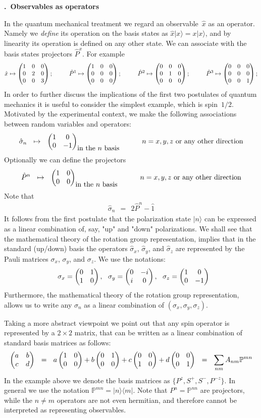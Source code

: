 \documentclass[onecolumn,fleqn, 11pt]{revtex4}
\newcommand{\amatrix}[1]{\begin{matrix} #1 \end{matrix}}
\newcommand{\beq}{\begin{eqnarray}}
\newcommand{\eeq}{\end{eqnarray}}
\renewcommand{\thesubsection}{\arabic{subsection}}
\renewcommand{\thesubsubsection}{\arabic{subsubsection}}
\newcommand{\sheadC}[1]
{
\addtocounter{subsubsection}{1}
\vspace{5mm}
{\bf \thesubsection.\thesubsubsection \ #1}  
\nopagebreak
\phantomsection
}
\begin{document}
 
\sheadC{Observables as operators}

In the quantum mechanical treatment 
we regard an observable~$\hat{x}$ as an operator.
Namely we {\em define} its operation on 
the basis states as $\hat{x}|x\rangle=x|x\rangle$, 
and by linearity its operation is defined on any other state.
We can associate with the basis states projectors $\hat{P}^x$.
For example  
\beq
\hat{x} \mapsto \left( \amatrix{1&0&0 \cr 0&2&0 \cr 0&0&3}\right);  
\ \ \ \ \ \ \ \
\hat{P}^1 \mapsto \left( \amatrix{1&0&0 \cr 0&0&0 \cr 0&0&0}\right);
\ \ \ \ \ \ \ \
\hat{P}^2 \mapsto \left( \amatrix{0&0&0 \cr 0&1&0 \cr 0&0&0}\right);
\ \ \ \ \ \ \ \
\hat{P}^3 \mapsto \left( \amatrix{0&0&0 \cr 0&0&0 \cr 0&0&1}\right);
\eeq
In order to further discuss the implications of the first two postulates 
of quantum mechanics it is useful to consider the simplest example, which is spin~$1/2$.
Motivated by the experimental context, we make the following associations between random variables and operators:
\beq
\hat{\sigma}_n \ \ \mapsto \ \ \left( \amatrix{1&0 \cr 0&-1}\right)_{\mbox{in the $n$ basis}} 
\ \ \ \ \ \ \ \ \ \mbox{$n=x,y,z$ or any other direction}
\eeq
Optionally we can define the projectors 
\beq
\hat{P}^n \ \ \mapsto \ \ \left( \amatrix{1&0 \cr 0&0}\right)_{\mbox{in the $n$ basis}} 
\ \ \ \ \ \ \ \ \ \mbox{$n=x,y,z$ or any other direction}
\eeq
Note that 
\beq
\hat{\sigma}_n \ \ = \ \ 2\hat{P}^n -\hat{1}
\eeq
It follows from the first postulate that the polarization state $|n\rangle$ 
can be expressed as a linear combination of, say, "up" and "down" polarizations. 
We shall see that the mathematical theory of the rotation group representation, 
implies that in the standard (up/down) basis 
the operators $\hat{\sigma}_x$, $\hat{\sigma}_y$, and $\hat{\sigma}_z$
are represented by the Pauli matrices $\sigma_x$, $\sigma_y$, and $\sigma_z$. 
We use the notations: 
\beq
\ \ \sigma_x = \left(\amatrix{0&1\cr 1&0}\right), 
\ \ \sigma_y = \left(\amatrix{0&-i\cr i&0}\right), 
\ \ \sigma_z = \left(\amatrix{1&0\cr 0&-1}\right)
\eeq
Furthermore, the mathematical theory of the rotation group representation,    
allows us to write any $\sigma_n$ as a linear combination of ${(\sigma_x, \sigma_y, \sigma_z)}$.  
  

Taking a more abstract viewpoint we point out that any spin operator 
is represented by a ${2\times 2}$ matrix, 
that can be written as a linear combination of standard basis matrices as follows:
\beq
\left( \amatrix{a&b\cr c&d}\right)
\ \ = \ \ a  \left(\amatrix{1&0\cr 0&0}\right) 
+ b  \left(\amatrix{0&1\cr 0&0}\right) 
+ c \left(\amatrix{0&0\cr 1&0}\right) 
+ d  \left(\amatrix{0&0\cr 0&1} \right) 
\ \ = \ \ 
\sum_{nm} A_{nm} \mathbb{P}^{mn} 
\eeq
In the example above we denote the basis matrices  
as ${ \{P^{z},S^{+},S^{-},P^{-z}\} }$.
In general we use the notation $\mathbb{P}^{mn} = |n\rangle\langle m|$. 
Note that ${P^n = \mathbb{P}^{nn}}$ are projectors, 
while the $n\ne m$ operators are not even hermitian, 
and therefore cannot be interpreted as representing observables.   
\end{document}
